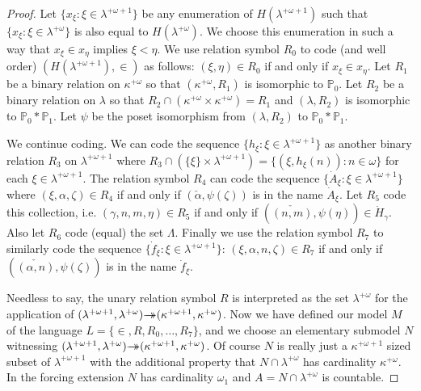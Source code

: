 \documentclass{amsart}
\theoremstyle{plain}
\theoremstyle{definition}
\theoremstyle{remark}
\theoremstyle{plain}
\theoremstyle{definition}
\theoremstyle{remark}
\begin{document}
\begin{proof}
            Let $\{ x_\xi : \xi\in \lambda^{+\omega+1}\}$ be any enumeration of
             $H(\lambda^{+\omega+1})$  such that
             $\{ x_\xi : \xi\in \lambda^{+\omega}\}$ is also equal to
             $H(\lambda^{+\omega})$. We choose this enumeration in such a way that
             $x_\xi\in x_\eta$ implies $\xi<\eta$.
            We use relation symbol $R_0$ to code
            (and well order)
             $(H(\lambda^{+\omega+1}), \in)$ as follows: $(\xi,\eta)\in R_0$
            if and only if $x_\xi\in x_\eta$.
            Let $R_1$ be a binary relation on $\kappa^{+\omega}$ so that
            $(\kappa^{+\omega},R_1)$ is isomorphic to $\mathbb P_0$. Let
             $R_2$ be a binary relation on $\lambda$ so that
             $R_2\cap (\kappa^{+\omega}\times \kappa^{+\omega})=R_1$ and
             $(\lambda,R_2)$ is isomorphic to $\mathbb P_0*\mathbb P_1$.
            Let $\psi$ be the poset isomorphism from $(\lambda,R_2)$ to
             $\mathbb P_0*\mathbb P_1$.

            We continue coding. We can code the sequence
             $\{ h_\xi : \xi\in \lambda^{+\omega+1}\}$ as another binary  relation
             $R_3$ on $\lambda^{+\omega+1}$ where $R_3\cap \left(\{\xi\}\times
             \lambda^{+\omega+1}\right) = \{ (\xi,h_\xi(n) ) : n\in \omega\}$
            for each $\xi\in \lambda^{+\omega+1}$. The relation symbol $R_4$ can
            code the sequence $\{ \dot A_\xi : \xi \in \lambda^{+\omega+1}\}$
            where $(\xi, \alpha, \zeta) \in R_4$ if and only if
            $(\check \alpha, \psi(\zeta))$ is in the name $\dot A_\xi$.
             Let $R_5$ code this collection, i.e.
             $(\gamma,n,m,\eta)\in R_5$ if and only if
             $(\check{(n,m)}, \psi(\eta))\in \dot H_\gamma$. Also let $R_6$ code
             (equal)  the set $\Lambda$.
            Finally we use the relation symbol $R_7$ to similarly code the
            sequence $\{ \dot f_\xi  : \xi \in \lambda^{+\omega+1}\}$:
             $(\xi, \alpha, n, \zeta) \in R_7$ if and only if
            $(\check {(\alpha,n)}, \psi(\zeta))$ is in the name $\dot f_\xi$.

            Needless to say, the unary relation symbol $R$
            is interpreted as the set $\lambda^{+\omega}$ for the application of
            $(\lambda^{+\omega+1},\lambda^{+\omega})\rlap{$\rightarrow$}\,{\rightarrow}
            (\kappa^{+\omega+1},\kappa^{+\omega})$.
             Now  we have defined our model
            $M$  of the language $L= \{\in, R, R_0,\ldots, R_7\}$,
             and we choose an elementary submodel
            $N$ witnessing
            $(\lambda^{+\omega+1},\lambda^{+\omega})\rlap{$\rightarrow$}\,{\rightarrow}
            (\kappa^{+\omega+1},\kappa^{+\omega})$. Of course $N$ is really just
            a $\kappa^{+\omega+1}$ sized subset of $\lambda^{+\omega+1}$
            with the additional property that $N\cap \lambda^{+\omega}$ has
            cardinality $\kappa^{+\omega}$.  In the
            forcing extension $N$ has cardinality $\omega_1$ and
             $A= N\cap \lambda^{+\omega}$ is countable.


\end{proof}
\end{document}
